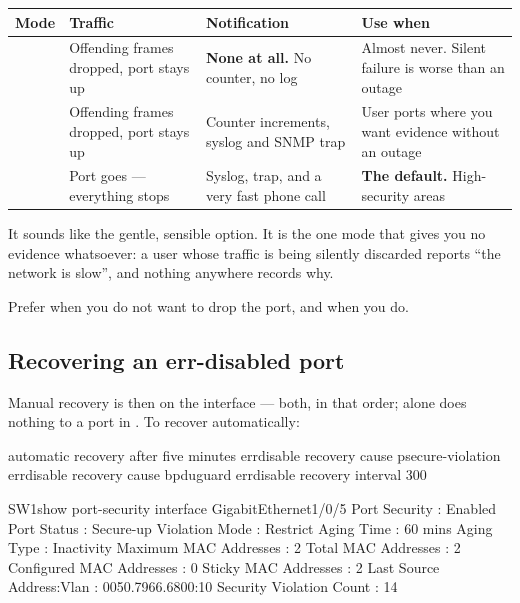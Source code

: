 \begin{longtable}{@{}L{2.5cm}L{4.0cm}L{4.2cm}L{4.2cm}@{}}
\toprule
{}
\textbf{Mode} & \textbf{Traffic} & \textbf{Notification} & \textbf{Use when} \\
\midrule
\endhead
{} & Offending frames dropped, port stays up &
\textbf{None at all.} No counter, no log &
Almost never. Silent failure is worse than an outage \\
 & Offending frames dropped, port stays up &
Counter increments, syslog and SNMP trap &
User ports where you want evidence without an outage \\
 & Port goes  --- everything stops &
Syslog, trap, and a very fast phone call &
\textbf{The default.} High-security areas \\
\bottomrule
\end{longtable}

\begin{conceptbox}
It sounds like the gentle, sensible option. It is the one mode that gives you no
evidence whatsoever: a user whose traffic is being silently discarded reports
``the network is slow'', and nothing anywhere records why.

Prefer  when you do not want to drop the port, and 
when you do.
\end{conceptbox}

\subsection{Recovering an err-disabled port}

Manual recovery is  then  on the interface ---
both, in that order;  alone does nothing to a port in
. To recover automatically:

\begin{config}{automatic recovery after five minutes}
errdisable recovery cause psecure-violation
errdisable recovery cause bpduguard
errdisable recovery interval 300
\end{config}

\begin{verify}{SW1}{show port-security interface GigabitEthernet1/0/5}
Port Security              : Enabled
Port Status                : Secure-up
Violation Mode             : Restrict
Aging Time                 : 60 mins
Aging Type                 : Inactivity
Maximum MAC Addresses      : 2
Total MAC Addresses        : 2
Configured MAC Addresses   : 0
Sticky MAC Addresses       : 2
Last Source Address:Vlan   : 0050.7966.6800:10
Security Violation Count   : 14
\end{verify}

